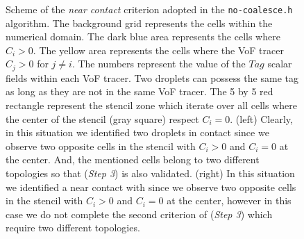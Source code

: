 \begin{figure}
    \caption{Scheme of the \textit{near contact} criterion adopted in the \texttt{no-coalesce.h} algorithm. 
    The background grid represents the cells within the numerical domain. 
    The dark blue area represents the cells where $C_i > 0$.
    The yellow area represents the cells where the VoF tracer $C_j > 0$ for $j\neq i$. 
    The numbers represent the value of the $Tag$ scalar fields within each VoF tracer.
    Two droplets can possess the same tag as long as they are not in the same VoF tracer. 
    The 5 by 5 red rectangle represent the stencil zone which iterate over all cells where the center of the stencil (gray square) respect $C_i = 0$. 
    (left)
    Clearly, in this situation we identified two droplets in contact since we observe two opposite cells in the stencil with $C_i > 0$ and $C_i=0$ at the center.
    And, the mentioned cells belong to two different topologies so that (\textit{Step 3}) is also validated.  
    (right) In this situation we identified a near contact with since we observe two opposite cells in the stencil with $C_i > 0$ and $C_i=0$ at the center, however in this case we do not complete the second criterion of (\textit{Step 3}) which require two different topologies. 
    }
    \label{fig:criterion}
\end{figure}

